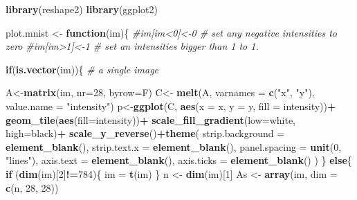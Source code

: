 \documentclass[
]{book}
\newenvironment{Shaded}{\begin{snugshade}}{\end{snugshade}}
\newcommand{\AttributeTok}[1]{\textcolor[rgb]{0.13,0.29,0.53}{#1}}
\newcommand{\CommentTok}[1]{\textcolor[rgb]{0.56,0.35,0.01}{\textit{#1}}}
\newcommand{\ControlFlowTok}[1]{\textcolor[rgb]{0.13,0.29,0.53}{\textbf{#1}}}
\newcommand{\DecValTok}[1]{\textcolor[rgb]{0.00,0.00,0.81}{#1}}
\newcommand{\FunctionTok}[1]{\textcolor[rgb]{0.13,0.29,0.53}{\textbf{#1}}}
\newcommand{\NormalTok}[1]{#1}
\newcommand{\OtherTok}[1]{\textcolor[rgb]{0.56,0.35,0.01}{#1}}
\newcommand{\SpecialCharTok}[1]{\textcolor[rgb]{0.81,0.36,0.00}{\textbf{#1}}}
\newcommand{\StringTok}[1]{\textcolor[rgb]{0.31,0.60,0.02}{#1}}
\theoremstyle{definition}
\theoremstyle{definition}
\theoremstyle{definition}
\theoremstyle{definition}
\theoremstyle{remark}
\begin{document}
\begin{Shaded}
\begin{Highlighting}[]
\FunctionTok{library}\NormalTok{(reshape2)}
\FunctionTok{library}\NormalTok{(ggplot2)}


\NormalTok{plot.mnist }\OtherTok{\textless{}{-}} \ControlFlowTok{function}\NormalTok{(im)\{}
  \CommentTok{\#im[im\textless{}0]\textless{}{-}0 \# set any negative intensities to zero}
  \CommentTok{\#im[im\textgreater{}1]\textless{}{-}1 \# set an intensities bigger than 1 to 1.}
  
  
  \ControlFlowTok{if}\NormalTok{(}\FunctionTok{is.vector}\NormalTok{(im))\{ }\CommentTok{\# a single image}
    
\NormalTok{    A}\OtherTok{\textless{}{-}}\FunctionTok{matrix}\NormalTok{(im, }\AttributeTok{nr=}\DecValTok{28}\NormalTok{, }\AttributeTok{byrow=}\NormalTok{F)}
\NormalTok{    C}\OtherTok{\textless{}{-}} \FunctionTok{melt}\NormalTok{(A, }\AttributeTok{varnames =} \FunctionTok{c}\NormalTok{(}\StringTok{"x"}\NormalTok{, }\StringTok{"y"}\NormalTok{), }
             \AttributeTok{value.name =} \StringTok{"intensity"}\NormalTok{)}
\NormalTok{    p}\OtherTok{\textless{}{-}}\FunctionTok{ggplot}\NormalTok{(C, }\FunctionTok{aes}\NormalTok{(}\AttributeTok{x =}\NormalTok{ x, }\AttributeTok{y =}\NormalTok{ y, }\AttributeTok{fill =}\NormalTok{ intensity))}\SpecialCharTok{+}
      \FunctionTok{geom\_tile}\NormalTok{(}\FunctionTok{aes}\NormalTok{(}\AttributeTok{fill=}\NormalTok{intensity))}\SpecialCharTok{+}
      \FunctionTok{scale\_fill\_gradient}\NormalTok{(}\AttributeTok{low=}\StringTok{\textquotesingle{}white\textquotesingle{}}\NormalTok{, }\AttributeTok{high=}\StringTok{\textquotesingle{}black\textquotesingle{}}\NormalTok{)}\SpecialCharTok{+}
      \FunctionTok{scale\_y\_reverse}\NormalTok{()}\SpecialCharTok{+}\FunctionTok{theme}\NormalTok{(}
        \AttributeTok{strip.background =} \FunctionTok{element\_blank}\NormalTok{(),}
        \AttributeTok{strip.text.x =} \FunctionTok{element\_blank}\NormalTok{(),}
        \AttributeTok{panel.spacing =} \FunctionTok{unit}\NormalTok{(}\DecValTok{0}\NormalTok{, }\StringTok{"lines"}\NormalTok{),}
        \AttributeTok{axis.text =} \FunctionTok{element\_blank}\NormalTok{(),}
        \AttributeTok{axis.ticks =} \FunctionTok{element\_blank}\NormalTok{()}
\NormalTok{      ) }
\NormalTok{  \}}
  \ControlFlowTok{else}\NormalTok{\{}
    \ControlFlowTok{if}\NormalTok{ (}\FunctionTok{dim}\NormalTok{(im)[}\DecValTok{2}\NormalTok{]}\SpecialCharTok{!=}\DecValTok{784}\NormalTok{)\{}
\NormalTok{      im }\OtherTok{=} \FunctionTok{t}\NormalTok{(im)}
\NormalTok{    \} }
\NormalTok{    n }\OtherTok{\textless{}{-}} \FunctionTok{dim}\NormalTok{(im)[}\DecValTok{1}\NormalTok{]}
\NormalTok{    As }\OtherTok{\textless{}{-}} \FunctionTok{array}\NormalTok{(im, }\AttributeTok{dim =} \FunctionTok{c}\NormalTok{(n, }\DecValTok{28}\NormalTok{, }\DecValTok{28}\NormalTok{))}
    

\end{Highlighting}
\end{Shaded}
\end{document}
